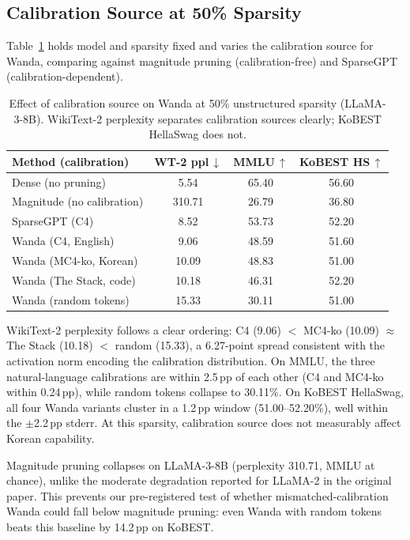 \documentclass{article}
\begin{document}
\subsection{Calibration Source at 50\% Sparsity}

Table~\ref{tab:calibration} holds model and sparsity fixed and varies the calibration source for Wanda, comparing against magnitude pruning (calibration-free) and SparseGPT (calibration-dependent).

\begin{table}[t]
  \caption{Effect of calibration source on Wanda at 50\% unstructured sparsity (LLaMA-3-8B). WikiText-2 perplexity separates calibration sources clearly; KoBEST HellaSwag does not.}
  \label{tab:calibration}
  \centering
  \small
  \begin{tabular}{@{}lccc@{}}
    \toprule
    Method (calibration) & WT-2 ppl\,$\downarrow$ & MMLU\,$\uparrow$ & KoBEST HS\,$\uparrow$ \\
    \midrule
    Dense (no pruning) & 5.54 & 65.40 & 56.60 \\
    \midrule
    Magnitude (no calibration) & 310.71 & 26.79 & 36.80 \\
    SparseGPT (C4) & 8.52 & 53.73 & 52.20 \\
    \midrule
    Wanda (C4, English) & 9.06 & 48.59 & 51.60 \\
    Wanda (MC4-ko, Korean) & 10.09 & 48.83 & 51.00 \\
    Wanda (The Stack, code) & 10.18 & 46.31 & 52.20 \\
    Wanda (random tokens) & 15.33 & 30.11 & 51.00 \\
    \bottomrule
  \end{tabular}
\end{table}

WikiText-2 perplexity follows a clear ordering: C4 (9.06) $<$ MC4-ko (10.09) $\approx$ The Stack (10.18) $<$ random (15.33), a 6.27-point spread consistent with the activation norm encoding the calibration distribution.
On MMLU, the three natural-language calibrations are within 2.5\,pp of each other (C4 and MC4-ko within 0.24\,pp), while random tokens collapse to 30.11\%.
On KoBEST HellaSwag, all four Wanda variants cluster in a 1.2\,pp window (51.00--52.20\%), well within the $\pm$2.2\,pp stderr.
At this sparsity, calibration source does not measurably affect Korean capability.

Magnitude pruning collapses on LLaMA-3-8B (perplexity 310.71, MMLU at chance), unlike the moderate degradation reported for LLaMA-2 in the original paper.
This prevents our pre-registered test of whether mismatched-calibration Wanda could fall below magnitude pruning: even Wanda with random tokens beats this baseline by 14.2\,pp on KoBEST.
\end{document}
